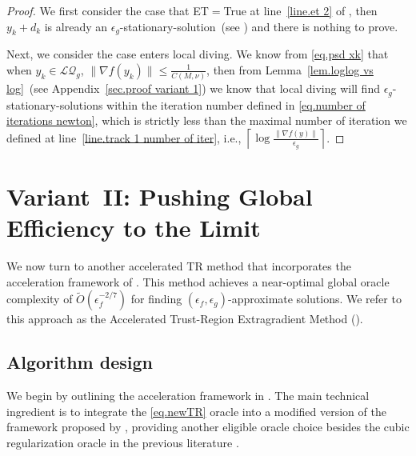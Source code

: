 \documentclass{article}
\begin{document}
\begin{proof}
    We first consider the case that ET$=$True at line~\ref{line.et 2} of , then $y_k+d_k$ is already an $\epsilon_g$-stationary-solution~(see ) and there is nothing to prove.

    Next, we consider the case  enters local diving. We know from \eqref{eq.psd xk} that when $y_k\in\mathcal{LQ}_g$, $\|\nabla f(y_k)\|\leq \frac{1}{C(M,\nu)}$, then from Lemma~\ref{lem.loglog vs log}~(see Appendix~\ref{sec.proof variant 1}) we know that local diving will find $\epsilon_g$-stationary-solutions within the iteration number defined in \eqref{eq.number of iterations newton}, which is strictly less than the maximal number of iteration we defined at line~\ref{line.track 1 number of iter}, i.e., $\left \lceil\log\frac{\|\nabla f(y)\|}{\epsilon_g} \right\rceil$.
\end{proof}


\section{Variant~II: Pushing Global Efficiency to the Limit}\label{sec.second variant}
We now turn to another accelerated TR method that incorporates the acceleration framework of \citet{monteiro2013accelerated}. This method achieves a near-optimal global oracle complexity of $\tilde{O}(\epsilon_f^{-2/7})$ for finding $(\epsilon_f,\epsilon_g)$-approximate solutions. We refer to this approach as the Accelerated Trust-Region Extragradient Method ().
\subsection{Algorithm design}
We begin by outlining the acceleration framework in . The main technical ingredient is to integrate the \ref{eq.newTR} oracle into a modified version of the framework proposed by \citet{monteiro2013accelerated}, providing another eligible oracle choice besides the cubic regularization oracle in the previous literature \cite{carmon2022optimal}.
\end{document}
